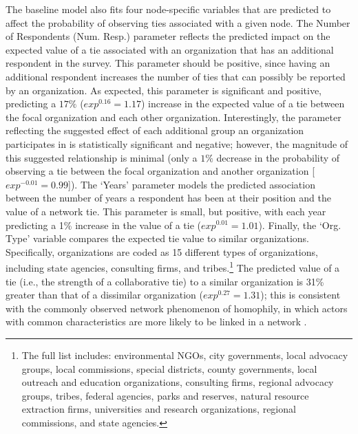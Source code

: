 \documentclass[12pt,a4paper,titlepage]{article}
\begin{document}
The baseline model also fits four node-specific variables that are predicted to affect the probability of observing ties associated with a given node. The Number of Respondents (Num. Resp.) parameter reflects the predicted impact on the expected value of a tie associated with an organization that has an additional respondent in the survey. This parameter should be positive, since having an additional respondent increases the number of ties that can possibly be reported by an organization. As expected, this parameter is significant and positive, predicting a $17\%$ ($exp^{0.16} = 1.17$) increase in the expected value of a tie between the focal organization and each other organization. Interestingly, the parameter reflecting the suggested effect of each additional group an organization participates in is statistically significant and negative; however, the magnitude of this suggested relationship is minimal (only a $1\%$ decrease in the probability of observing a tie between the focal organization and another organization [$exp^{-0.01} = 0.99$]). The `Years' parameter models the predicted association between the number of years a respondent has been at their position and the value of a network tie. This parameter is small, but positive, with each year predicting a 1\% increase in the value of a tie ($exp^{0.01} = 1.01$). Finally, the `Org. Type' variable compares the expected tie value to similar organizations. Specifically, organizations are coded as 15 different types of organizations, including state agencies, consulting firms, and tribes.\footnote{The full list includes: environmental NGOs, city governments, local advocacy groups, local commissions, special districts, county governments, local outreach and education organizations, consulting firms, regional advocacy groups, tribes, federal agencies, parks and reserves, natural resource extraction firms, universities and research organizations, regional commissions, and state agencies.} The predicted value of a tie (i.e., the strength of a collaborative tie) to a similar organization is 31\% greater than that of a dissimilar organization ($exp^{0.27} = 1.31$); this is consistent with the commonly observed network phenomenon of homophily, in which actors with common characteristics are more likely to be linked in a network \parencite{prell2012,kolaczyk2009}.
\end{document}
